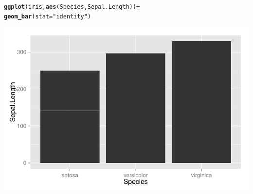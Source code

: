 \documentclass{beamer}\usepackage[]{graphicx}\usepackage[]{color}
\makeatletter
\newcommand{\hlstr}[1]{\textcolor[rgb]{0.192,0.494,0.8}{#1}}%
\newcommand{\hlopt}[1]{\textcolor[rgb]{0,0,0}{#1}}%
\newcommand{\hlstd}[1]{\textcolor[rgb]{0.345,0.345,0.345}{#1}}%
\newcommand{\hlkwc}[1]{\textcolor[rgb]{0.333,0.667,0.333}{#1}}%
\newcommand{\hlkwd}[1]{\textcolor[rgb]{0.737,0.353,0.396}{\textbf{#1}}}%
\newenvironment{kframe}{%
 \def\at@end@of@kframe{}%
 \ifinner\ifhmode%
  \def\at@end@of@kframe{\end{minipage}}%
  \begin{minipage}{\columnwidth}%
 \fi\fi%
 \def\FrameCommand##1{\hskip\@totalleftmargin \hskip-\fboxsep
 \colorbox{shadecolor}{##1}\hskip-\fboxsep
     \hskip-\linewidth \hskip-\@totalleftmargin \hskip\columnwidth}%
 \MakeFramed {\advance\hsize-\width
   \@totalleftmargin\z@ \linewidth\hsize
   \@setminipage}}%
 {\par\unskip\endMakeFramed%
 \at@end@of@kframe}
\newenvironment{knitrout}{}{} %
\makeatother
\begin{document}
\begin{frame}[fragile]
\begin{knitrout}\footnotesize
{}\color{fgcolor}\begin{kframe}
\begin{alltt}
\hlkwd{ggplot}\hlstd{(iris,} \hlkwd{aes}\hlstd{(Species, Sepal.Length))} \hlopt{+}
\hlkwd{geom_bar}\hlstd{(}\hlkwc{stat} \hlstd{=} \hlstr{"identity"}\hlstd{)}
\end{alltt}
\end{kframe}

{\centering \includegraphics[width=.75\linewidth]{figure/barone} 

}



\end{knitrout}
\end{frame}

\end{document}
